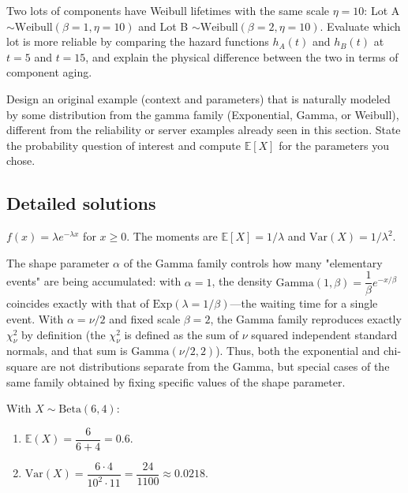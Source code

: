 \begin{problema}
	\label{prob:0f44096}
	Two lots of components have Weibull lifetimes with the same scale $\eta=10$: Lot A $\sim \text{Weibull}(\beta=1,\eta=10)$ and Lot B $\sim \text{Weibull}(\beta=2,\eta=10)$. Evaluate which lot is more reliable by comparing the hazard functions $h_A(t)$ and $h_B(t)$ at $t=5$ and $t=15$, and explain the physical difference between the two in terms of component aging.
\end{problema}

\begin{problema}
	\label{prob:31a003b}
	Design an original example (context and parameters) that is naturally modeled by some distribution from the gamma family (Exponential, Gamma, or Weibull), different from the reliability or server examples already seen in this section. State the probability question of interest and compute $\mathbb{E}[X]$ for the parameters you chose.
\end{problema}

\subsection*{Detailed solutions}

\begin{solproblema}[prob:f00c4b6]
	$f(x) = \lambda e^{-\lambda x}$ for $x\ge0$. The moments are $\mathbb{E}[X] = 1/\lambda$ and $\text{Var}(X) = 1/\lambda^2$.
\end{solproblema}

\begin{solproblema}[prob:de365e8]
	The shape parameter $\alpha$ of the Gamma family controls how many "elementary events" are being accumulated: with $\alpha=1$, the density $\text{Gamma}(1,\beta) = \dfrac{1}{\beta}e^{-x/\beta}$ coincides exactly with that of $\text{Exp}(\lambda=1/\beta)$---the waiting time for a single event. With $\alpha=\nu/2$ and fixed scale $\beta=2$, the Gamma family reproduces exactly $\chi^2_\nu$ by definition (the $\chi^2_\nu$ is defined as the sum of $\nu$ squared independent standard normals, and that sum is $\text{Gamma}(\nu/2,2)$). Thus, both the exponential and chi-square are not distributions separate from the Gamma, but special cases of the same family obtained by fixing specific values of the shape parameter.
\end{solproblema}

\begin{solproblema}[prob:491786c]
	With $X\sim\text{Beta}(6,4)$:
	\begin{enumerate}
		\item $\mathbb{E}(X) = \dfrac{6}{6+4} = 0.6$.
		\item $\text{Var}(X) = \dfrac{6\cdot4}{10^2\cdot11} = \dfrac{24}{1100} \approx 0.0218$.
	\end{enumerate}
\end{solproblema}

